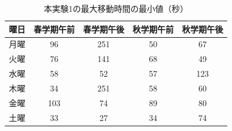 \documentclass[12pt, a4paper, fleqn]{jreport}
\begin{document}
\begin{table}[H]
\caption{本実験1の最大移動時間の最小値（秒）}
\label{j:normal_information}
\begin{center}
\begin{tabular}{c|c|c|c|c}
\hline
曜日 & 春学期午前 & 春学期午後 & 秋学期午前 & 秋学期午後\\
\hline
月曜  & 96  & 251 & 50 & 67 \\
火曜  & 76  & 141 & 68 & 49 \\
水曜  & 58  & 52  & 57 & 123\\
木曜  & 34  & 251 & 58 & 60 \\
金曜  & 103 & 74  & 89 & 80 \\
土曜  & 33  & 27  & 34 & 74 \\
\hline
\end{tabular}
\end{center}
\end{table}
\fi
\end{document}
